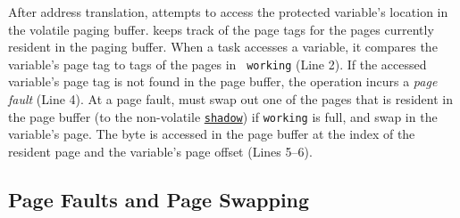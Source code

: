 After address translation, \sys attempts to access the protected variable's
location in the volatile paging buffer. \sys keeps track of the page tags for
the pages currently resident in the paging buffer. When a task accesses a
variable, it compares the variable's page tag to tags of the pages in {\tt
working} (Line 2).
%
%
If the accessed variable's page tag is not found in the page buffer, the
operation incurs a {\em page fault} (Line 4). At a page fault, \sys must swap
out one of the pages that is resident in the page buffer (to the non-volatile
\texttt{\underline{shadow}}) if \texttt{working} is full, and swap in the
variable's page.
%
The byte is accessed in the page buffer at the index of the resident page and
the variable's page offset (Lines 5--6).


\subsection{Page Faults and Page Swapping}

